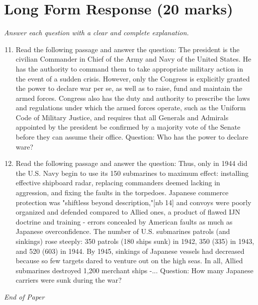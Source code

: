 \documentclass[12pt]{article}
\begin{document}
\section*{Long Form Response (20 marks)}
\textit{Answer each question with a clear and complete explanation.}
\begin{enumerate}[label=\arabic*.]
\setcounter{enumi}{10}
\item Read the following passage and answer the question: The president is the civilian Commander in Chief of the Army and Navy of the United States. He has the authority to command them to take appropriate military action in the event of a sudden crisis. However, only the Congress is explicitly granted the power to declare war per se, as well as to raise, fund and maintain the armed forces. Congress also has the duty and authority to prescribe the laws and regulations under which the armed forces operate, such as the Uniform Code of Military Justice, and requires that all Generals and Admirals appointed by the president be confirmed by a majority vote of the Senate before they can assume their office. Question: Who has the power to declare ware?
\item Read the following passage and answer the question: Thus, only in 1944 did the U.S. Navy begin to use its 150 submarines to maximum effect: installing effective shipboard radar, replacing commanders deemed lacking in aggression, and fixing the faults in the torpedoes. Japanese commerce protection was "shiftless beyond description,"[nb 14] and convoys were poorly organized and defended compared to Allied ones, a product of flawed IJN doctrine and training - errors concealed by American faults as much as Japanese overconfidence. The number of U.S. submarines patrols (and sinkings) rose steeply: 350 patrols (180 ships sunk) in 1942, 350 (335) in 1943, and 520 (603) in 1944. By 1945, sinkings of Japanese vessels had decreased because so few targets dared to venture out on the high seas. In all, Allied submarines destroyed 1,200 merchant ships -... Question: How many Japanese carriers were sunk during the war?
\end{enumerate}

\vfill
\noindent\textit{End of Paper}
\end{document}
